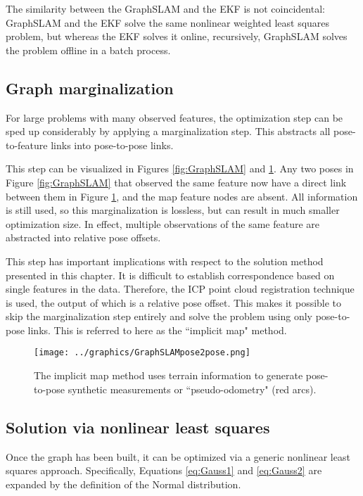 The similarity between the GraphSLAM and the EKF is not coincidental: GraphSLAM and the EKF solve the same nonlinear weighted least squares problem, but whereas the EKF solves it online, recursively, GraphSLAM solves the problem offline in a batch process. 

\subsection{Graph marginalization}
\label{sec.marginalization}
For large problems with many observed features, the optimization step can be sped up considerably by applying a marginalization step. This abstracts all pose-to-feature links into pose-to-pose links. 

This step can be visualized in Figures \ref{fig:GraphSLAM} and \ref{fig:RelativePoses}. Any two poses in Figure \ref{fig:GraphSLAM} that observed the same feature now have a direct link between them in Figure \ref{fig:RelativePoses}, and the map feature nodes are absent. All information is still used, so this marginalization is lossless, but can result in much smaller optimization size. In effect, multiple observations of the same feature are abstracted into relative pose offsets.

This step has important implications with respect to the solution method presented in this chapter. It is difficult to establish correspondence based on single features in the data. Therefore, the ICP point cloud registration technique is used, the output of which is a relative pose offset. This makes it possible to skip  the marginalization step entirely and solve the problem using only pose-to-pose links. This is referred to here as the ``implicit map" method.


\begin{figure}[htb]
   \centering
   \texttt{[image: ../graphics/GraphSLAMpose2pose.png]} %
   \caption{The implicit map method uses terrain information to generate pose-to-pose synthetic measurements or ``pseudo-odometry" (red arcs). }
   \label{fig:RelativePoses}
\end{figure}

\subsection{Solution via nonlinear least squares}

Once the graph has been built, it can be optimized via a generic nonlinear least squares approach. Specifically, Equations \ref{eq:Gauss1} and \ref{eq:Gauss2} are expanded by the definition of the Normal distribution.

